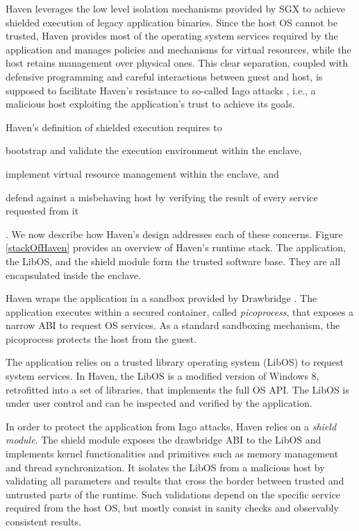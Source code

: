 Haven leverages the low level isolation mechanisms provided by SGX to achieve shielded execution of legacy application binaries.
Since the host OS cannot be trusted, Haven provides most of the operating system services required by the application and manages policies and mechanisms for virtual resources, while the host retains management over physical ones.
This clear separation, coupled with defensive programming and careful interactions between guest and host, is supposed to facilitate Haven's resistance to so-called Iago attacks \cite{DBLP:conf/asplos/CheckowayS13}, i.e., a malicious host exploiting the application's trust to achieve its goals.

Haven's definition of shielded execution requires to
\begin{enumerate*}
	\item bootstrap and validate the execution environment within the enclave,
	\item implement virtual resource management within the enclave, and
	\item defend against a misbehaving host by verifying the result of every service requested from it%
\end{enumerate*}.
We now describe how Haven's design addresses each of these concerns.
Figure \ref{stackOfHaven} provides an overview of Haven's runtime stack.
The application, the LibOS, and the shield module form the trusted software base.
They are all encapsulated inside the enclave.

Haven wraps the application in a sandbox provided by Drawbridge \cite{DBLP:conf/asplos/PorterBHOH11}.
The application executes within a secured container, called \emph{picoprocess}, that exposes a narrow ABI to request OS services.
As a standard sandboxing mechanism, the picoprocess protects the host from the guest.

The application relies on a trusted library operating system (LibOS) to request system services.
In Haven, the LibOS is a modified version of Windows 8, retrofitted into a set of libraries, that implements the full OS API.
The LibOS is under user control and can be inspected and verified by the application.

In order to protect the application from Iago attacks, Haven relies on a \emph{shield module}.
The shield module exposes the drawbridge ABI to the LibOS and implements kernel functionalities and primitives such as memory management and thread synchronization.
It isolates the LibOS from a malicious host by validating all parameters and results that cross the border between trusted and untrusted parts of the runtime.
Such validations depend on the specific service required from the host OS, but mostly consist in sanity checks and observably consistent results.

